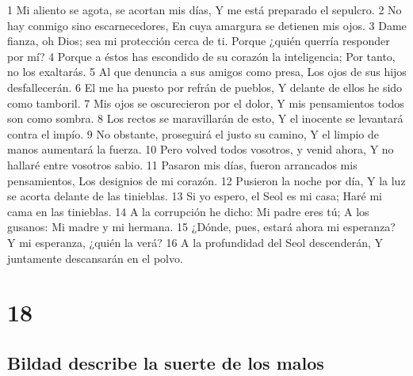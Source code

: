 1 Mi aliento se agota, se acortan mis días,
Y me está preparado el sepulcro.
2 No hay conmigo sino escarnecedores,
En cuya amargura se detienen mis ojos.
3 Dame fianza, oh Dios; sea mi protección cerca de ti.
Porque ¿quién querría responder por mí?
4 Porque a éstos has escondido de su corazón la inteligencia;
Por tanto, no los exaltarás.
5 Al que denuncia a sus amigos como presa,
Los ojos de sus hijos desfallecerán.
6 El me ha puesto por refrán de pueblos,
Y delante de ellos he sido como tamboril.
7 Mis ojos se oscurecieron por el dolor,
Y mis pensamientos todos son como sombra.
8 Los rectos se maravillarán de esto,
Y el inocente se levantará contra el impío.
9 No obstante, proseguirá el justo su camino,
Y el limpio de manos aumentará la fuerza.
10 Pero volved todos vosotros, y venid ahora,
Y no hallaré entre vosotros sabio.
11 Pasaron mis días, fueron arrancados mis pensamientos,
Los designios de mi corazón.
12 Pusieron la noche por día,
Y la luz se acorta delante de las tinieblas.
13 Si yo espero, el Seol es mi casa;
Haré mi cama en las tinieblas.
14 A la corrupción he dicho: Mi padre eres tú;
A los gusanos: Mi madre y mi hermana.
15 ¿Dónde, pues, estará ahora mi esperanza?
Y mi esperanza, ¿quién la verá?
16 A la profundidad del Seol descenderán,
Y juntamente descansarán en el polvo. 

\chapter{18}

\section*{Bildad describe la suerte de los malos}


